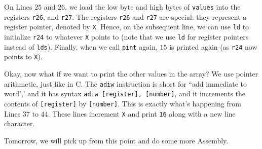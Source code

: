 On Lines $25$ and $26$, we load the low byte and high bytes of \verb!values! into the registers \verb!r26!, and \verb!r27!. The registers \verb!r26! and \verb!r27! are special: they represent a register pointer, denoted by \verb!X!. Hence, on the subsequent line, we can use \verb!ld! to initialize \verb!r24! to whatever \verb!X! points to (note that we use \verb!ld! for register pointers instead of \verb!lds!). Finally, when we call \verb!pint! again, $15$ is printed again (as \verb!r24! now points to \verb!X!).

Okay, now what if we want to print the other values in the array? We use pointer arithmetic, just like in C. The \verb!adiw! instruction is short for ``add immediate to word',' and it has syntax \verb!adiw [register], [number]!, and it increments the contents of \verb![register]! by \verb![number]!. This is exactly what's happening from Lines $37$ to $44$. These lines increment \verb!X! and print \verb!16! along with a new line character.


Tomorrow, we will pick up from this point and do some more Assembly.